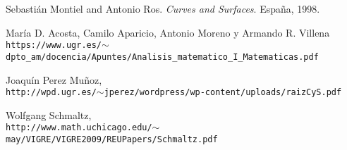 \documentclass[paper=a4, fontsize=11pt, spanish]{scrartcl}
\theoremstyle{definition}
\theoremstyle{definition}
\theoremstyle{definition}
\begin{document}

\newpage

\begin{thebibliography}{9}
Sebastián Montiel and Antonio Ros.
\textit{Curves and Surfaces}.
España, 1998.

María D. Acosta, Camilo Aparicio, Antonio Moreno y Armando R. Villena
\\\texttt{https://www.ugr.es/$\sim$dpto\_am/docencia/Apuntes/Analisis\_matematico\_I\_Matematicas.pdf}

Joaquín Perez Muñoz,
\\\texttt{http://wpd.ugr.es/$\sim$jperez/wordpress/wp-content/uploads/raizCyS.pdf}

Wolfgang Schmaltz,
\\\texttt{http://www.math.uchicago.edu/$\sim$may/VIGRE/VIGRE2009/REUPapers/Schmaltz.pdf}
\end{thebibliography}
\end{document}
